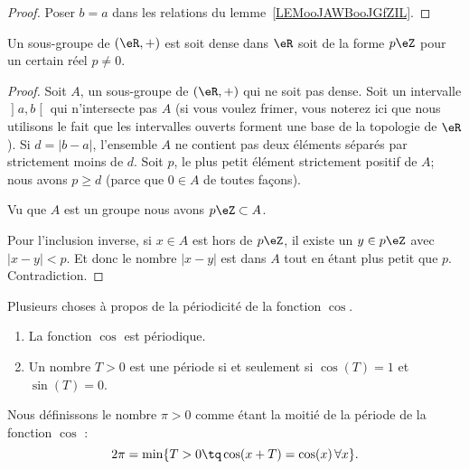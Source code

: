 \begin{proof}
    Poser \( b=a\) dans les relations du lemme~\ref{LEMooJAWBooJGfZIL}.
\end{proof}

\begin{lemma}       \label{LEMooPQWWooMdPWUT}
    Un sous-groupe de \( (\eR,+)\) est soit dense dans \( \eR\) soit de la forme \( p\eZ\) pour un certain réel \( p\neq 0\).
\end{lemma}

\begin{proof}
    Soit \( A\), un sous-groupe de \( (\eR,+)\) qui ne soit pas dense. Soit un intervalle \( \mathopen] a , b \mathclose[\) qui n'intersecte pas \( A\) (si vous voulez frimer, vous noterez ici que nous utilisons le fait que les intervalles ouverts forment une base de la topologie de \( \eR\)). Si \( d=| b-a |\), l'ensemble \( A\) ne contient pas deux éléments séparés par strictement moins de \( d\). Soit \( p\), le plus petit élément strictement positif de \( A\); nous avons \( p\geq d\) (parce que \( 0\in A\) de toutes façons).

        Vu que \( A\) est un groupe nous avons \( p\eZ\subset A\).

        Pour l'inclusion inverse, si \( x\in A\) est hors de \( p\eZ\), il existe un \( y\in p\eZ\) avec \( | x-y |<p\). Et donc le nombre \( | x-y |\) est dans \( A\) tout en étant plus petit que \( p\). Contradiction.
\end{proof}

\begin{propositionDef}      \label{PROPooFRVCooKSgYUM}
    Plusieurs choses à propos de la périodicité de la fonction \( \cos\).
    \begin{enumerate}
        \item
            La fonction \( \cos\) est périodique.
        \item
            Un nombre \( T>0\) est une période si et seulement si \( \cos(T)=1\) et \( \sin(T)=0\).
    \end{enumerate}
    
    Nous définissons le nombre \( \pi>0\) comme étant la moitié de la période de la fonction \( \cos\) :
    \begin{equation}
        2\pi=\min\{ T>0\tq \cos(x+T)=\cos(x)\,\forall x \}.
    \end{equation}

\end{propositionDef}


